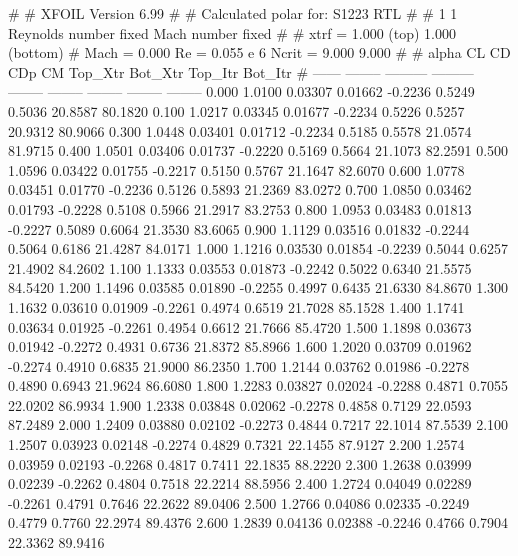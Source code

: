 #  
#       XFOIL         Version 6.99
#  
# Calculated polar for: S1223 RTL                                       
#  
# 1 1 Reynolds number fixed          Mach number fixed         
#  
# xtrf =   1.000 (top)        1.000 (bottom)  
# Mach =   0.000     Re =     0.055 e 6     Ncrit =   9.000  9.000
#  
#   alpha    CL        CD       CDp       CM     Top_Xtr  Bot_Xtr  Top_Itr  Bot_Itr
#  ------ -------- --------- --------- -------- -------- -------- -------- --------
   0.000   1.0100   0.03307   0.01662  -0.2236   0.5249   0.5036  20.8587  80.1820
   0.100   1.0217   0.03345   0.01677  -0.2234   0.5226   0.5257  20.9312  80.9066
   0.300   1.0448   0.03401   0.01712  -0.2234   0.5185   0.5578  21.0574  81.9715
   0.400   1.0501   0.03406   0.01737  -0.2220   0.5169   0.5664  21.1073  82.2591
   0.500   1.0596   0.03422   0.01755  -0.2217   0.5150   0.5767  21.1647  82.6070
   0.600   1.0778   0.03451   0.01770  -0.2236   0.5126   0.5893  21.2369  83.0272
   0.700   1.0850   0.03462   0.01793  -0.2228   0.5108   0.5966  21.2917  83.2753
   0.800   1.0953   0.03483   0.01813  -0.2227   0.5089   0.6064  21.3530  83.6065
   0.900   1.1129   0.03516   0.01832  -0.2244   0.5064   0.6186  21.4287  84.0171
   1.000   1.1216   0.03530   0.01854  -0.2239   0.5044   0.6257  21.4902  84.2602
   1.100   1.1333   0.03553   0.01873  -0.2242   0.5022   0.6340  21.5575  84.5420
   1.200   1.1496   0.03585   0.01890  -0.2255   0.4997   0.6435  21.6330  84.8670
   1.300   1.1632   0.03610   0.01909  -0.2261   0.4974   0.6519  21.7028  85.1528
   1.400   1.1741   0.03634   0.01925  -0.2261   0.4954   0.6612  21.7666  85.4720
   1.500   1.1898   0.03673   0.01942  -0.2272   0.4931   0.6736  21.8372  85.8966
   1.600   1.2020   0.03709   0.01962  -0.2274   0.4910   0.6835  21.9000  86.2350
   1.700   1.2144   0.03762   0.01986  -0.2278   0.4890   0.6943  21.9624  86.6080
   1.800   1.2283   0.03827   0.02024  -0.2288   0.4871   0.7055  22.0202  86.9934
   1.900   1.2338   0.03848   0.02062  -0.2278   0.4858   0.7129  22.0593  87.2489
   2.000   1.2409   0.03880   0.02102  -0.2273   0.4844   0.7217  22.1014  87.5539
   2.100   1.2507   0.03923   0.02148  -0.2274   0.4829   0.7321  22.1455  87.9127
   2.200   1.2574   0.03959   0.02193  -0.2268   0.4817   0.7411  22.1835  88.2220
   2.300   1.2638   0.03999   0.02239  -0.2262   0.4804   0.7518  22.2214  88.5956
   2.400   1.2724   0.04049   0.02289  -0.2261   0.4791   0.7646  22.2622  89.0406
   2.500   1.2766   0.04086   0.02335  -0.2249   0.4779   0.7760  22.2974  89.4376
   2.600   1.2839   0.04136   0.02388  -0.2246   0.4766   0.7904  22.3362  89.9416
